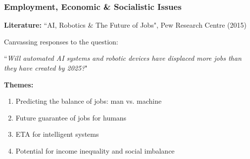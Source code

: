 \documentclass[10pt, compress]{beamer}
\begin{document}
%  
%   
%  	
%  	
%

\begin{frame}[fragile]
  \frametitle{Employment, Economic \& Socialistic Issues}
  
   \small{ 
   
   	\textbf{Literature:} ``AI, Robotics \& The Future of Jobs", Pew Research Centre (2015)
   	
   	\vspace{10pt}
   	
   	Canvassing responses to the question:
  	
 	``\textit{Will automated AI systems and robotic devices have displaced more jobs than they have created by 2025?}"
   	
   	\vspace{5pt}
   	
 	\textbf{Themes:}
  	
  	\begin{enumerate}
  		\item Predicting the balance of jobs: man vs. machine
  		\item Future guarantee of jobs for humans
  		\item ETA for intelligent systems
  		\item Potential for income inequality and social imbalance
  	\end{enumerate}
   
 
     }

\end{frame}
\end{document}
